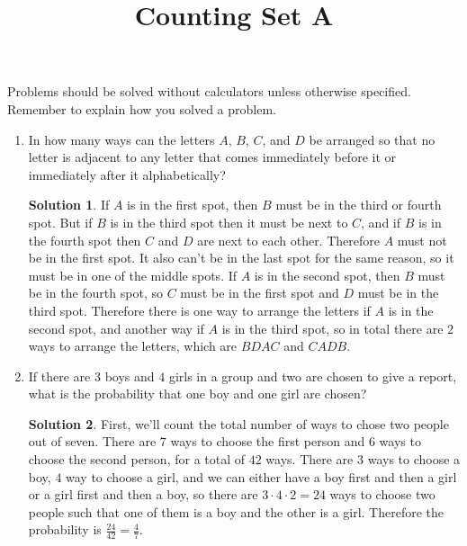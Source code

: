 \documentclass{article}
\title{Counting Set A}
\author{}
\date{}
\theoremstyle{definition}
\newtheorem*{solution}{Solution}
\begin{document}
\maketitle
\noindent Problems should be solved without calculators unless otherwise 
specified. Remember to explain how you solved a problem.
\begin{enumerate}
    \item In how many ways can the letters $A$, $B$, $C$, and $D$ be arranged so 
        that no letter is adjacent to any letter that comes immediately before 
        it or immediately after it alphabetically?
        \begin{solution}
            If $A$ is in the first spot, then $B$ must be in the third or fourth 
            spot. But if $B$ is in the third spot then it must be next to $C$, 
            and if $B$ is in the fourth spot then $C$ and $D$ are next to each 
            other. Therefore $A$ must not be in the first spot. It also can't be 
            in the last spot for the same reason, so it must be in one of the 
            middle spots. If $A$ is in the second spot, then $B$ must be in the 
            fourth spot, so $C$ must be in the first spot and $D$ must be in the 
            third spot. Therefore there is one way to arrange the letters if $A$ 
            is in the second spot, and another way if $A$ is in the third spot, 
            so in total there are $2$ ways to arrange the letters, which are 
            $BDAC$ and $CADB$.
        \end{solution}
    \item If there are $3$ boys and $4$ girls in a group and two are chosen to 
        give a report, what is the probability that one boy and one girl are 
        chosen?
        \begin{solution}
            First, we'll count the total number of ways to chose two people out 
            of seven. There are $7$ ways to choose the first person and $6$ ways 
            to choose the second person, for a total of $42$ ways. There are $3$ 
            ways to choose a boy, $4$ way to choose a girl, and we can either 
            have a boy first and then a girl or a girl first and then a boy, so 
            there are $3 \cdot 4 \cdot 2 = 24$ ways to choose two people such 
            that one of them is a boy and the other is a girl. Therefore the 
            probability is $\frac{24}{42} = \frac{4}{7}$.


\end{solution}
\end{enumerate}
\end{document}
